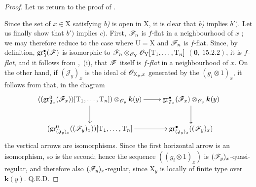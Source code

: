 \begin{proof}
Let us return to the proof of .

Since the set of $x\in\mathrm{X}$ satisfying \emph{b)} is open in $\mathrm{X}$, it is clear that \emph{b)} implies $b')$. Let us finally show that $b')$ implies $c)$. First, $\mathscr{F}_n$ is $f$-flat in a neighbourhood of $x$ ; we may therefore reduce to the case where $\mathrm{U}=\mathrm{X}$ and $\mathscr{F}_n$ is $f$-flat. Since, by definition, $\operatorname{gr}^\bullet_\mathfrak{J}(\mathscr{F})$ is isomorphic to $\mathscr{F}_n\otimes_{\mathscr{O}_\mathrm{Y}}\mathscr{O}_\mathrm{Y}[\mathrm{T}_1,\ldots,\mathrm{T}_n]$ $(\mathbf{0},~15.2.2)$, it is \emph{$f$-flat}, and it follows from ,~(i), that $\mathscr{F}$ itself is \emph{$f$-flat} in a neighbourhood of $x$. On the other hand, if $(\mathscr{J}_y)_x$ is the ideal of $\mathscr{O}_{\mathrm{X}_y,x}$ generated by the $(g_i\otimes 1)_x$, it follows from  that, in the diagram
\[
\xymatrix{
  ((\operatorname{gr}^0_{\mathfrak{J}_x}(\sh{F}_x))[\mathrm{T}_1,\ldots,\mathrm{T}_n])\otimes_{\sh{O}_y}\boldsymbol{k}(y) \ar[r] \ar[d] & \operatorname{gr}^\bullet_{\mathfrak{J}_x}(\sh{F}_x)\otimes_{\sh{O}_y}\boldsymbol{k}(y) \ar[d] \\
  (\operatorname{gr}^0_{(\mathfrak{J}_y)_x}((\sh{F}_y)_x))[\mathrm{T}_1,\ldots,\mathrm{T}_n] \ar[r] & \operatorname{gr}^\bullet_{(\mathfrak{J}_y)_x}((\sh{F}_y)_x)
}
\]
the vertical arrows are isomorphisms. Since the first horizontal arrow is an isomorphism, so is the second; hence the sequence $((g_i\otimes 1)_x)$ is $(\mathscr{F}_y)_x$-quasi-regular, and therefore also $(\mathscr{F}_y)_x$-regular, since $\mathrm{X}_y$ is locally of finite type over $\boldsymbol{k}(y)$. Q.E.D.
\end{proof}

